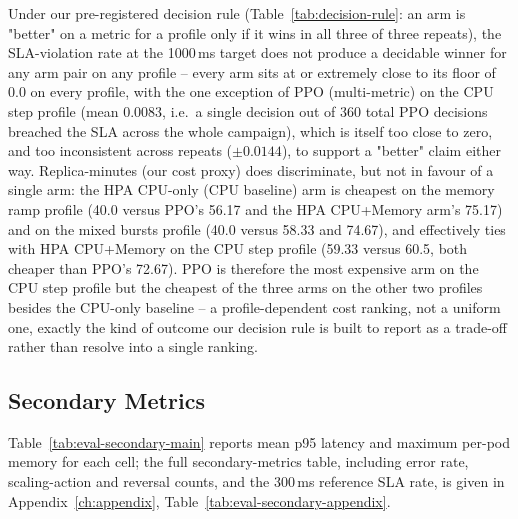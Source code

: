 Under our pre-registered decision rule (Table~\ref{tab:decision-rule}: an
arm is "better" on a metric for a profile only if it wins in all three of
three repeats), the SLA-violation rate at the 1000\,ms target does not
produce a decidable winner for any arm pair on any profile -- every arm
sits at or extremely close to its floor of 0.0 on every profile, with the
one exception of PPO (multi-metric) on the CPU step profile (mean 0.0083,
i.e.\ a single decision out of 360 total PPO decisions breached the SLA
across the whole campaign), which is itself too close to zero, and too
inconsistent across repeats ($\pm 0.0144$), to support a "better" claim
either way. Replica-minutes (our cost proxy) does discriminate, but not in
favour of a single arm: the HPA CPU-only (CPU baseline) arm is cheapest on
the memory ramp profile (40.0 versus PPO's 56.17 and the HPA CPU+Memory
arm's 75.17) and on the mixed bursts profile (40.0 versus 58.33 and
74.67), and effectively ties with HPA CPU+Memory on the CPU step profile
(59.33 versus 60.5, both cheaper than PPO's 72.67). PPO is therefore the
most expensive arm on the CPU step profile but the cheapest of the three
arms on the other two profiles besides the CPU-only baseline -- a
profile-dependent cost ranking, not a uniform one, exactly the kind of
outcome our decision rule is built to report as a trade-off rather than
resolve into a single ranking.

\subsection{Secondary Metrics}

Table~\ref{tab:eval-secondary-main} reports mean p95 latency and maximum
per-pod memory for each cell; the full secondary-metrics table, including
error rate, scaling-action and reversal counts, and the 300\,ms reference
SLA rate, is given in Appendix~\ref{ch:appendix},
Table~\ref{tab:eval-secondary-appendix}.

